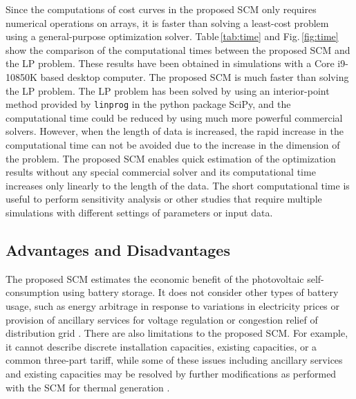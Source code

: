 \documentclass[lettersize,journal]{IEEEtran}
\newcommand{\figref}[1]{Fig.\,\ref{#1}}
\newcommand{\tabref}[1]{Table\,\ref{#1}}
\newcommand{\secref}[1]{Section\,\ref{#1}}
\begin{document}
%
Since the computations of cost curves in the proposed SCM only requires numerical operations on arrays, it is faster than solving a least-cost problem using a general-purpose optimization solver.
\tabref{tab:time} and \figref{fig:time} show the comparison of the  computational times between the proposed SCM and the LP problem. %
These results have been obtained in simulations with a Core i9-10850K based desktop computer. 
The proposed SCM is much faster than solving the LP problem. 
The LP problem has been solved by using an interior-point method provided by \texttt{linprog} in the python package SciPy, and the computational time could be reduced by using much more powerful commercial solvers. 
However, when the length of data is increased, the rapid increase in the computational time can not be avoided due to the increase in the dimension of the problem. 
The proposed SCM enables quick estimation of the optimization results without any special commercial solver and its computational time increases only linearly to the length of the data. 
The short computational time is useful to perform sensitivity analysis or other studies that require multiple simulations with different settings of parameters or input data.



\subsection{Advantages and Disadvantages}

The proposed SCM estimates the economic benefit of the photovoltaic self-consumption using battery storage.   
It does not consider other types of battery usage, such as energy arbitrage in response to variations in electricity prices \cite{telaretti16,zurfi17}  or provision of ancillary services for voltage regulation or congestion relief of distribution grid \cite{maeyaert20}. 
There are also limitations to the proposed SCM.
For example, it cannot describe discrete installation capacities, existing capacities, or a common three-part tariff, while some of these issues including ancillary services and existing capacities may be resolved by further modifications as performed with the SCM for thermal generation \cite{zhang15,zhang17}. 
\end{document}
